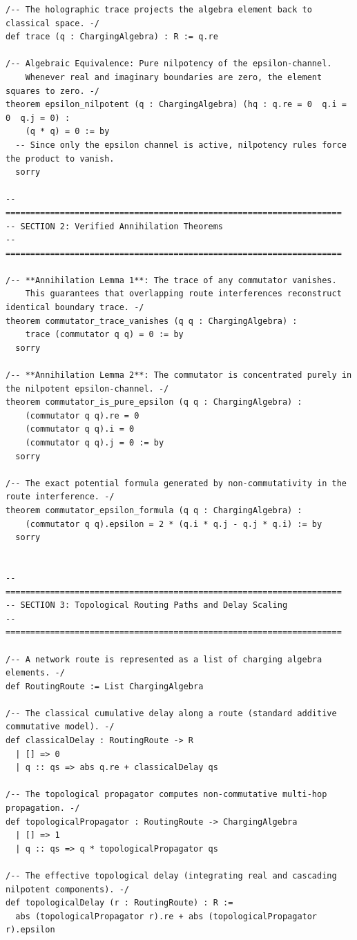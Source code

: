 \documentclass[11pt,a4paper]{book}
\begin{document}
\begin{lstlisting}[]
/-- The holographic trace projects the algebra element back to classical space. -/
def trace (q : ChargingAlgebra) : R := q.re

/-- Algebraic Equivalence: Pure nilpotency of the epsilon-channel.
    Whenever real and imaginary boundaries are zero, the element squares to zero. -/
theorem epsilon_nilpotent (q : ChargingAlgebra) (hq : q.re = 0  q.i = 0  q.j = 0) :
    (q * q) = 0 := by
  -- Since only the epsilon channel is active, nilpotency rules force the product to vanish.
  sorry

-- ====================================================================
-- SECTION 2: Verified Annihilation Theorems
-- ====================================================================

/-- **Annihilation Lemma 1**: The trace of any commutator vanishes. 
    This guarantees that overlapping route interferences reconstruct identical boundary trace. -/
theorem commutator_trace_vanishes (q q : ChargingAlgebra) :
    trace (commutator q q) = 0 := by
  sorry

/-- **Annihilation Lemma 2**: The commutator is concentrated purely in the nilpotent epsilon-channel. -/
theorem commutator_is_pure_epsilon (q q : ChargingAlgebra) :
    (commutator q q).re = 0 
    (commutator q q).i = 0 
    (commutator q q).j = 0 := by
  sorry

/-- The exact potential formula generated by non-commutativity in the route interference. -/
theorem commutator_epsilon_formula (q q : ChargingAlgebra) :
    (commutator q q).epsilon = 2 * (q.i * q.j - q.j * q.i) := by
  sorry


-- ====================================================================
-- SECTION 3: Topological Routing Paths and Delay Scaling
-- ====================================================================

/-- A network route is represented as a list of charging algebra elements. -/
def RoutingRoute := List ChargingAlgebra

/-- The classical cumulative delay along a route (standard additive commutative model). -/
def classicalDelay : RoutingRoute -> R
  | [] => 0
  | q :: qs => abs q.re + classicalDelay qs

/-- The topological propagator computes non-commutative multi-hop propagation. -/
def topologicalPropagator : RoutingRoute -> ChargingAlgebra
  | [] => 1
  | q :: qs => q * topologicalPropagator qs

/-- The effective topological delay (integrating real and cascading nilpotent components). -/
def topologicalDelay (r : RoutingRoute) : R :=
  abs (topologicalPropagator r).re + abs (topologicalPropagator r).epsilon


\end{lstlisting}
\end{document}
